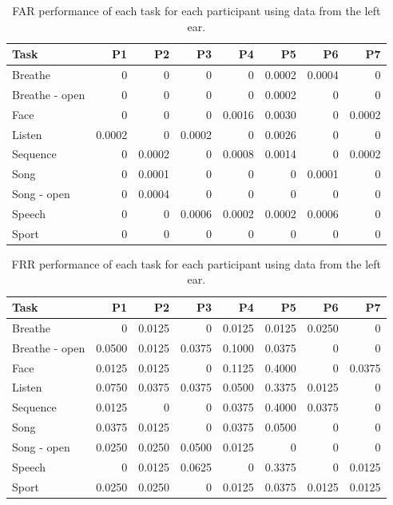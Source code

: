 \documentclass[a4paper,twoside]{article}
\begin{document}
\begin{table}
\caption{FAR performance of each task for each participant using data from the left ear.}
\label{tab:farall}
\begin{center}
\begin{tabular*}{\textwidth}{@{\extracolsep{\fill}}lrrrrrrr}
\textbf{Task} & P1 & P2 & P3 & P4 & P5 & P6 & P7\\ \hline
Breathe & 0 & 0 & 0 & 0 & 0.0002 & 0.0004 & 0\\
Breathe - open & 0 & 0 & 0 & 0 & 0.0002 & 0 & 0\\
Face & 0 & 0 & 0 & 0.0016 & 0.0030 & 0 & 0.0002\\
Listen & 0.0002 & 0 & 0.0002 & 0 & 0.0026 & 0 & 0\\
Sequence & 0 & 0.0002 & 0 & 0.0008 & 0.0014 & 0 & 0.0002\\
Song & 0 & 0.0001 & 0 & 0 & 0 & 0.0001 & 0\\
Song - open & 0 & 0.0004 & 0 & 0 & 0 & 0 & 0\\
Speech & 0 & 0 & 0.0006 & 0.0002 & 0.0002 & 0.0006 & 0\\
Sport & 0 & 0 & 0 & 0 & 0 & 0 & 0\\ \hline
\end{tabular*}
\end{center}
\end{table}

\begin{table}
\caption{FRR performance of each task for each participant using data from the left ear.}
\label{tab:frrall}
\begin{center}
\begin{tabular*}{\textwidth}{@{\extracolsep{\fill}}lrrrrrrr}
\textbf{Task} & P1 & P2 & P3 & P4 & P5 & P6 & P7\\ \hline
Breathe & 0 & 0.0125 & 0 & 0.0125 & 0.0125 & 0.0250 & 0\\
Breathe - open & 0.0500 & 0.0125 & 0.0375 & 0.1000 & 0.0375 & 0 & 0\\
Face & 0.0125 & 0.0125 & 0 & 0.1125 & 0.4000 & 0 & 0.0375\\
Listen & 0.0750 & 0.0375 & 0.0375 & 0.0500 & 0.3375 & 0.0125 & 0\\
Sequence & 0.0125 & 0 & 0 & 0.0375 & 0.4000 & 0.0375 & 0\\
Song & 0.0375 & 0.0125 & 0 & 0.0375 & 0.0500 & 0 & 0\\
Song - open & 0.0250 & 0.0250 & 0.0500 & 0.0125 & 0 & 0 & 0\\
Speech & 0 & 0.0125 & 0.0625 & 0 & 0.3375 & 0 & 0.0125\\
Sport & 0.0250 & 0.0250 & 0 & 0.0125 & 0.0375 & 0.0125 & 0.0125\\ \hline
\end{tabular*}
\end{center}
\end{table}
\end{document}

